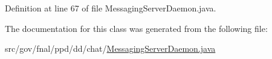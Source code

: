 Definition at line 67 of file Messaging\-Server\-Daemon.\-java.



The documentation for this class was generated from the following file\-:\begin{DoxyCompactItemize}
\item 
src/gov/fnal/ppd/dd/chat/\hyperlink{MessagingServerDaemon_8java}{Messaging\-Server\-Daemon.\-java}\end{DoxyCompactItemize}

